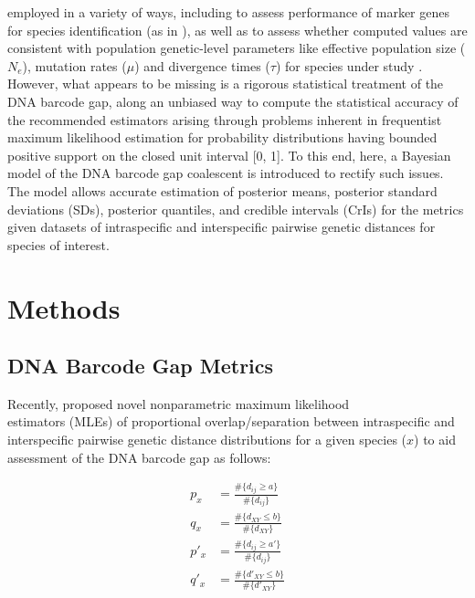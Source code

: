 \documentclass[12pt]{article}
\begin{document}
employed in a variety of ways, including to assess performance of marker genes for species identification (as in \citet{phillips2024measure}), as well as to assess whether computed values are consistent with population genetic-level parameters like effective population size ($N_e$), mutation rates ($\mu$) and divergence times ($\tau$) for species under study \citep{mather2019practical}. However, what appears to be missing is a rigorous statistical treatment of the DNA barcode gap, along an unbiased way to compute the statistical accuracy of the recommended estimators arising through problems inherent in frequentist maximum likelihood estimation for probability distributions having bounded positive support on the closed unit interval [0, 1]. To this end, here, a Bayesian model of the DNA barcode gap coalescent is introduced to rectify such issues. The model allows accurate estimation of posterior means, posterior standard deviations (SDs), posterior quantiles, and credible intervals (CrIs) for the metrics given datasets of intraspecific and interspecific pairwise genetic distances for species of interest.


\section{Methods}

\subsection{DNA Barcode Gap Metrics}

Recently, \citet{phillips2024measure} proposed novel nonparametric maximum likelihood \\ estimators (MLEs) of proportional overlap/separation between intraspecific and interspecific pairwise genetic distance distributions for a given species ($x$) to aid assessment of the DNA barcode gap as follows:

\begin{align}
p_x &= \frac{\#\{d_{ij} \geq a\}}{\#\{d_{ij}\}} \\[1mm]
q_x &= \frac{\#\{d_{XY} \leq b\}}{\#\{d_{XY}\}} \\[1mm]
p'_x &= \frac{\#\{d_{ij} \geq a'\}}{\#\{d_{ij}\}} \\[1mm]
q'_x &= \frac{\#\{d'_{XY} \leq b\}}{\#\{d'_{XY}\}}
\end{align}
\end{document}
